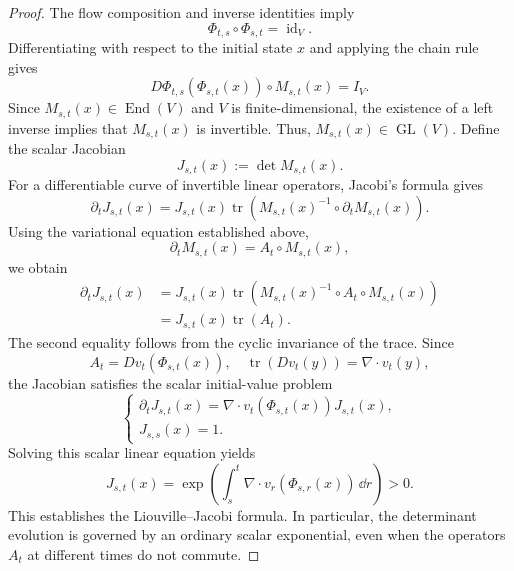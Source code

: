 \documentclass[12pt,a4paper,oneside]{book}
\begin{document}
\begin{proof}
The flow composition and inverse identities imply
\begin{equation*}
    \Phi_{t,s}\circ\Phi_{s,t}=\operatorname{id}_V.
\end{equation*}
Differentiating with respect to the initial state $x$ and applying the chain rule gives
\begin{equation*}
    D\Phi_{t,s}(\Phi_{s,t}(x))\circ M_{s,t}(x)=I_V.
\end{equation*}
Since $M_{s,t}(x)\in\operatorname{End}(V)$ and $V$ is finite-dimensional, the existence of a left inverse implies that
$M_{s,t}(x)$ is invertible. Thus, $M_{s,t}(x)\in\operatorname{GL}(V)$. Define the scalar Jacobian
\begin{equation*}
    J_{s,t}(x):=\det M_{s,t}(x).
\end{equation*}
For a differentiable curve of invertible linear operators, Jacobi's formula gives
\begin{equation*}
    \partial_t J_{s,t}(x) = J_{s,t}(x)\operatorname{tr}
        \left(
            M_{s,t}(x)^{-1} \circ \partial_t M_{s,t}(x)
        \right).
\end{equation*}
Using the variational equation established above,
\begin{equation*}
    \partial_t M_{s,t}(x) = A_t\circ M_{s,t}(x),
\end{equation*}
we obtain
\begin{equation*}
    \begin{aligned}
        \partial_t J_{s,t}(x) &= J_{s,t}(x)\operatorname{tr}
            \left(
                M_{s,t}(x)^{-1}\circ A_t\circ M_{s,t}(x)
            \right)\\
        &= J_{s,t}(x)\operatorname{tr}(A_t).
    \end{aligned}
\end{equation*}
The second equality follows from the cyclic invariance of the trace. Since
\begin{equation*}
    A_t=Dv_t(\Phi_{s,t}(x)), \quad \operatorname{tr}(Dv_t(y))=\nabla\cdot v_t(y),
\end{equation*}
the Jacobian satisfies the scalar initial-value problem
\begin{equation*}
    \begin{cases}
        \displaystyle \partial_t J_{s,t}(x) = \nabla\cdot v_t(\Phi_{s,t}(x))J_{s,t}(x),\\
        J_{s,s}(x)=1.
    \end{cases}
\end{equation*}
Solving this scalar linear equation yields
\begin{equation*}
    J_{s,t}(x) = \exp
    \left(
        \int_s^t \nabla\cdot v_r(\Phi_{s,r}(x))\,\dd r
    \right)>0.
\end{equation*}
This establishes the Liouville--Jacobi formula. In particular, the determinant evolution is governed by an ordinary scalar
exponential, even when the operators $A_t$ at different times do not commute.
\end{proof}
\end{document}
